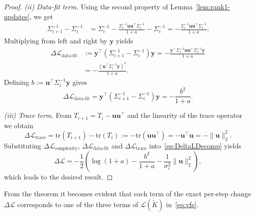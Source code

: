 \documentclass[onefignum,onetabnum]{siamart250211}
\newcommand{\tr}{\mathrm{tr}}
\begin{document}
\begin{proof}
    \noindent
    \emph{(ii) Data-fit term.}
    Using the second property of Lemma~\ref{lem:rank1-updates}, we get
    \begin{align*}
        \Sigma_{i+1}^{-1} - \Sigma_i^{-1}
        &= 
        \Sigma_i^{-1}
        -
        \frac{\Sigma_i^{-1}\bm{u} \bm{u}^\top \Sigma_i^{-1}}{1+a} - \Sigma_i^{-1}
        = -\frac{\Sigma_i^{-1}\bm{u} \bm{u}^\top \Sigma_i^{-1}}{1+a}.
    \end{align*}
    Multiplying from left and right by $\bm y$ yields
    \begin{align*}
        \Delta \mathcal{L}_{\text{data-fit}} &:=  \bm y^\top(\Sigma_{i+1}^{-1}-\Sigma_i^{-1})\bm y
        =
        -
        \frac{\bm{y}^\top \Sigma_i^{-1}\bm{u}
        \bm{u}^\top \Sigma_i^{-1}\bm{y}}{1+a}
         \nonumber \\
        &=
        - \frac{(\bm{u}^\top \Sigma_i^{-1}\bm y)^2}{1+a}.
    \end{align*}
    Defining $b := \bm{u}^\top \Sigma_i^{-1}\bm y$ gives
    \begin{equation*}
        \Delta\mathcal{L}_{\text{data-fit}} = \bm y^\top(\Sigma_{i+1}^{-1}-\Sigma_i^{-1})\bm y
        =
        -
        \frac{b^2}{1+a}.
    \end{equation*}
    
     
    \noindent
    \emph{(iii) Trace term.}
    From $T_{i+1}=T_i-\bm{u}\bm{u}^\top$ and the linearity of the trace operator we obtain
    \begin{equation*}
        \Delta \mathcal{L}_{\text{trace}} = \tr(T_{i+1})-\tr(T_i)
        := -\tr(\bm{u}\bm{u}^\top)
        = -\bm{u}^\top \bm{u}
        =-\|\bm{u}\|_2^2.
    \end{equation*}
    Substituting $\Delta\mathcal{L}_{\text{complexity}}$, $\Delta\mathcal{L}_{\text{data-fit}}$ and $\Delta\mathcal{L}_{\text{trace}}$ into~\eqref{eq:DeltaLDecomp}
    yields
    \begin{equation*}
        \Delta \mathcal L
        =
        -\frac{1}{2}\left(
        \log(1+a)
        -
        \frac{b^2}{1+a}
        -
        \frac{1}{\sigma_\varepsilon^2}\|\bm{u}\|_2^2
        \right),
    \end{equation*}
    which leads to the desired result.
\end{proof}
From the theorem it becomes evident that each term of the exact per-step change $\Delta \mathcal{L}$ corresponds to one of the three terms of $\mathcal{L}(\widetilde{K})$ in~\eqref{eq:vfe}.
\end{document}
